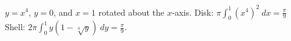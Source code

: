 {$y=x^4$, $y=0$, and $x=1$ rotated about the $x$-axis.}
{\noindent Disk: $\pi\int_0^1(x^4)^2\ dx=\frac\pi9$\\
Shell: $2\pi\int_0^1 y(1-\sqrt[4]y)\ dy=\frac\pi9$.}
